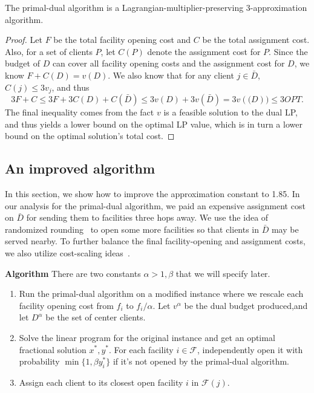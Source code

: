 \begin{thm}
The primal-dual algorithm is a Lagrangian-multiplier-preserving 3-approximation algorithm.
\end{thm}
\begin{proof}
Let $F$ be the total facility opening cost and $C$ be the total assignment cost.
Also, for a set of clients $P$, let $C(P)$ denote the assignment cost for $P$.
Since the budget of $D$ can cover all facility opening costs and the assignment cost for $D$, we know
$F + C(D) = v(D)$.
We also know that for any client $j \in \bar D$, $C(j) \le 3 v_j$, and thus
\[  3F + C \le 3F + 3C(D) + C(\bar D) \le 3v(D) + 3v(\bar D) = 3v(\mathcal(D)) \le 3 OPT. \]
The final inequality comes from the fact $v$ is a feasible solution to the dual LP, and thus yields a lower bound on the optimal LP value, which is in turn a lower bound on the optimal solution's total cost.
\end{proof}

\subsection{An improved algorithm}

In this section, we show how to improve the approximation constant to 1.85. In our analysis for the primal-dual algorithm, we paid an expensive assignment cost on $\bar D$ for sending them to facilities three hops away. We use the idea of randomized rounding~\cite{chudak2003improved} to open some more facilities so that clients in $\bar D$ may be served nearby. To further balance the final facility-opening and assignment costs, we also utilize cost-scaling ideas~\cite{charikar2005improved}.

\textbf{Algorithm}
There are two constants $\alpha > 1, \beta$ that we will specify later.

\begin{enumerate}
\item Run the primal-dual algorithm on a modified instance
where we rescale each facility opening cost from $f_i$ to $f_i/\alpha$.
Let $v^\alpha$ be the dual budget produced,and let $D^\alpha$ be the set of center clients.
\item Solve the linear program for the original instance and get an optimal fractional solution $x^*, y^*$.
For each facility $i \in \mathcal{F}$, independently open it with probability $\min\{1, \beta y^*_i\}$
if it's not opened by the primal-dual algorithm.
\item Assign each client to its closest open facility $i$ in $\mathcal{F}(j)$.
\end{enumerate}


